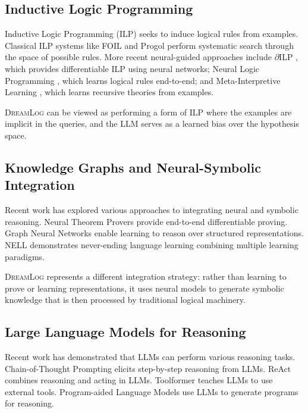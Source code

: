 \documentclass[11pt,a4paper]{article}
\newcommand{\dreamlog}{\textsc{DreamLog}}
\begin{document}
\subsection{Inductive Logic Programming}

Inductive Logic Programming (ILP) \citep{muggleton1994inductive} seeks to induce logical rules from examples. Classical ILP systems like FOIL \citep{quinlan1990learning} and Progol \citep{muggleton1995inverse} perform systematic search through the space of possible rules. More recent neural-guided approaches include $\partial$ILP \citep{evans2018learning}, which provides differentiable ILP using neural networks; Neural Logic Programming \citep{yang2017differentiable}, which learns logical rules end-to-end; and Meta-Interpretive Learning \citep{muggleton2014meta}, which learns recursive theories from examples.

\dreamlog{} can be viewed as performing a form of ILP where the examples are implicit in the queries, and the LLM serves as a learned bias over the hypothesis space.

\subsection{Knowledge Graphs and Neural-Symbolic Integration}

Recent work has explored various approaches to integrating neural and symbolic reasoning. Neural Theorem Provers \citep{rocktaschel2017end} provide end-to-end differentiable proving. Graph Neural Networks \citep{battaglia2018relational} enable learning to reason over structured representations. NELL \citep{mitchell2018never} demonstrates never-ending language learning combining multiple learning paradigms.

\dreamlog{} represents a different integration strategy: rather than learning to prove or learning representations, it uses neural models to generate symbolic knowledge that is then processed by traditional logical machinery.

\subsection{Large Language Models for Reasoning}

Recent work has demonstrated that LLMs can perform various reasoning tasks. Chain-of-Thought Prompting \citep{wei2022chain} elicits step-by-step reasoning from LLMs. ReAct \citep{yao2023react} combines reasoning and acting in LLMs. Toolformer \citep{schick2023toolformer} teaches LLMs to use external tools. Program-aided Language Models \citep{gao2023pal} use LLMs to generate programs for reasoning.
\end{document}
